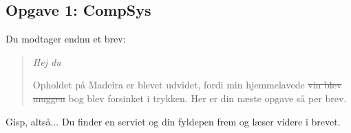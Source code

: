 \subsection{Opgave 1: CompSys}

Du modtager endnu et brev:

\begin{quote}

{\em Hej du

Opholdet på Madeira er blevet udvidet, fordi min hjemmelavede \sout{vin blev
muggen} \hspace{1mm} bog blev forsinket i trykken.  Her er din næste opgave så
per brev.}

\end{quote}

Gisp, altså...  Du finder en serviet og din fyldepen frem og læser videre i
brevet.

